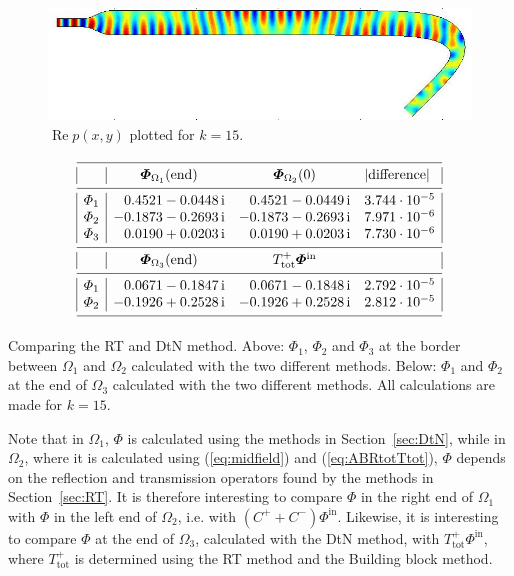 \documentclass[numreferences]{kluwer}
\providecommand{\abs}[1]{\left\lvert#1\right\rvert}
\renewcommand{\Phi}{\varPhi}
\renewcommand{\Re}{\operatorname{Re}}
\renewcommand{\vec}[1]{\bm{#1}}
\renewcommand{\i}{\,\mathrm{i}}
\renewcommand{\Phi}{\varPhi}
\newcommand{\Phiin}{\vec\Phi^{\text{in}}}
\newcommand{\Ttot}{T^+_{\text{tot}}}
\begin{document}
\begin{figure}[ht]
  \centering
  \includegraphics[width=\linewidth]{phitot3a}
  \caption{$\Re p(x,y)$ plotted for $k=15$.}
  \label{fig:phitot3a}
\end{figure}

\begin{table}[h]
  \begin{equation*}
    \begin{array}{|l|rrl|}
      \hline
      &\multicolumn1c{\vec\Phi_{\Omega_1}(\text{end})}
      &\multicolumn1c{\vec\Phi_{\Omega_2}(0)}
      &\abs{\text{difference}}\\
      \hline
      \Phi_1&0.4521-0.0448\i&0.4521-0.0449\i&3.744\cdot10^{-5}\\
      \Phi_2&-0.1873-0.2693\i&-0.1873-0.2693\i&7.971\cdot10^{-6}\\
      \Phi_3&0.0190+0.0203\i&0.0190+0.0203\i&7.730\cdot10^{-6}\\
      \hline 
      &\multicolumn1c{\vec\Phi_{\Omega_3}(\text{end})}
      &\multicolumn1c{\Ttot\Phiin}
      &\\
      \hline
      \Phi_1&0.0671-0.1847\i&0.0671-0.1848\i&2.792\cdot10^{-5}\\
      \Phi_2&-0.1926+0.2528\i&-0.1926+0.2528\i&2.812\cdot10^{-5}\\
      \hline
    \end{array}
  \end{equation*}
  \caption{Comparing the RT and DtN method. Above: $\Phi_1$, $\Phi_2$
    and $\Phi_3$ at the border between $\Omega_1$ and $\Omega_2$
    calculated with the two different methods. Below:
    $\Phi_1$ and $\Phi_2$ at the end of $\Omega_3$
    calculated with the two different methods. All calculations are
    made for  $k=15$.}
  \label{tab:phires-bcend}
  \tabwidth{\textwidth}
\end{table}

Note that in $\Omega_1$, $\vec\Phi$ is calculated using the methods in
Section~\ref{sec:DtN}, while in $\Omega_2$, where it is calculated
using (\ref{eq:midfield}) and (\ref{eq:ABRtotTtot}), $\vec\Phi$
depends on the reflection and transmission operators found by the
methods in Section~\ref{sec:RT}. It is therefore interesting to
compare $\vec\Phi$ in the right end of $\Omega_1$ with $\vec\Phi$ in
the left end of $\Omega_2$, i.e. with $(C^++C^-)\Phiin$. Likewise, it
is interesting to compare $\vec\Phi$ at the end of $\Omega_3$,
calculated with the DtN method, with $\Ttot\Phiin$, where $\Ttot$ is
determined using the RT method and the Building block method. 
\end{document}
